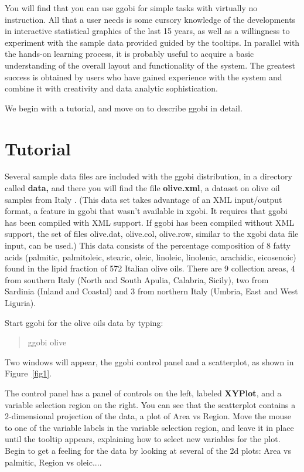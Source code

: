 \documentclass[11pt]{article}
\begin{document}
You will find that you can use ggobi for simple tasks with virtually
no instruction.  All that a user needs is some cursory knowledge of
the developments in interactive statistical graphics of the last 15
years, as well as a willingness to experiment with the sample data
provided guided by the tooltips.  In parallel with the hands-on learning
process, it is probably useful to acquire a basic understanding of
the overall layout and functionality of the system.  The greatest
success is obtained by users who have gained experience with the
system and combine it with creativity and data analytic
sophistication.

We begin with a tutorial, and move on to describe ggobi in detail.

\section{Tutorial}

Several sample data files are included with the ggobi distribution, in
a directory called {\bf data,} and there you will find the file {\bf
olive.xml}, a dataset on olive oil samples from Italy \cite{FALT83}.
(This data set takes advantage of an XML input/output format, a
feature in ggobi that wasn't available in xgobi. It requires that
ggobi has been compiled with XML support. If ggobi has been compiled
without XML support, the set of files olive.dat, olive.col, olive.row,
similar to the xgobi data file input, can be used.) This data consists
of the percentage composition of 8 fatty acids (palmitic, palmitoleic,
stearic, oleic, linoleic, linolenic, arachidic, eicosenoic) found in
the lipid fraction of 572 Italian olive oils. There are 9 collection
areas, 4 from southern Italy (North and South Apulia, Calabria,
Sicily), two from Sardinia (Inland and Coastal) and 3 from northern
Italy (Umbria, East and West Liguria).

Start ggobi for the olive oils data by typing:

\begin{quote}
ggobi olive
\end{quote}

Two windows will appear, the ggobi control panel and a scatterplot,
as shown in Figure~\ref{fig1}.

The control panel has a panel of controls on the left, labeled {\bf
XYPlot}, and a variable selection region on the right.  You can see
that the scatterplot contains a 2-dimensional projection of the data,
a plot of Area vs Region.  Move the mouse to one of the variable labels
in the variable selection region, and leave it in place until the
tooltip appears, explaining how to select new variables for the
plot.   Begin to get a feeling for the data by looking at several of
the 2d plots:  Area vs palmitic, Region vs oleic....
\end{document}
